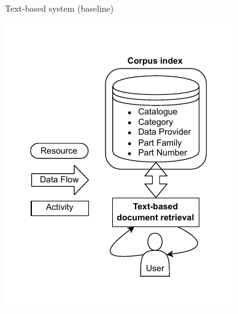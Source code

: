 \begin{frame}{Text-based system (baseline)}

        \vspace{-2em}
        \begin{center}
            \includegraphics[scale=1]{images/tp-expe-text-based-sys-legende.pdf} 
        \end{center}

\end{frame}

